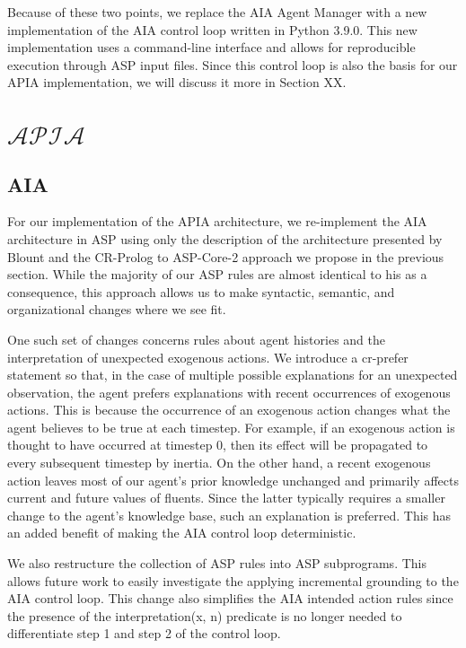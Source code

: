 Because of these two points, we replace the AIA Agent Manager with a new implementation of the AIA control loop written in Python 3.9.0.
This new implementation uses a command-line interface and allows for reproducible execution through ASP input files.
Since this control loop is also the basis for our APIA implementation, we will discuss it more in Section XX.

\section{$\mathcal{APIA}$}

\subsection{AIA}

For our implementation of the APIA architecture, we re-implement the AIA architecture in ASP using only the description of the architecture presented by Blount and the CR-Prolog to ASP-Core-2 approach we propose in the previous section.
While the majority of our ASP rules are almost identical to his as a consequence, this approach allows us to make syntactic, semantic, and organizational changes where we see fit.

One such set of changes concerns rules about agent histories and the interpretation of unexpected exogenous actions.
We introduce a cr-prefer statement so that, in the case of multiple possible explanations for an unexpected observation, the agent prefers explanations with recent occurrences of exogenous actions.
This is because the occurrence of an exogenous action changes what the agent believes to be true at each timestep.
For example, if an exogenous action is thought to have occurred at timestep 0, then its effect will be propagated to every subsequent timestep by inertia.
On the other hand, a recent exogenous action leaves most of our agent's prior knowledge unchanged and primarily affects current and future values of fluents.
Since the latter typically requires a smaller change to the agent's knowledge base, such an explanation is preferred.
This has an added benefit of making the AIA control loop deterministic.

We also restructure the collection of ASP rules into ASP subprograms.
This allows future work to easily investigate the applying incremental grounding to the AIA control loop.
This change also simplifies the AIA intended action rules since the presence of the interpretation(x, n) predicate is no longer needed to differentiate step 1 and step 2 of the control loop.

